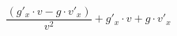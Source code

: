 \documentclass[a4paper,12pt]{article}
\begin{document}
$$ \frac{(g'_{x}  \cdot v - g \cdot v'_{x} )}{v ^{2} }  + g'_{x}  \cdot v + g \cdot v'_{x} $$
\end{document}
